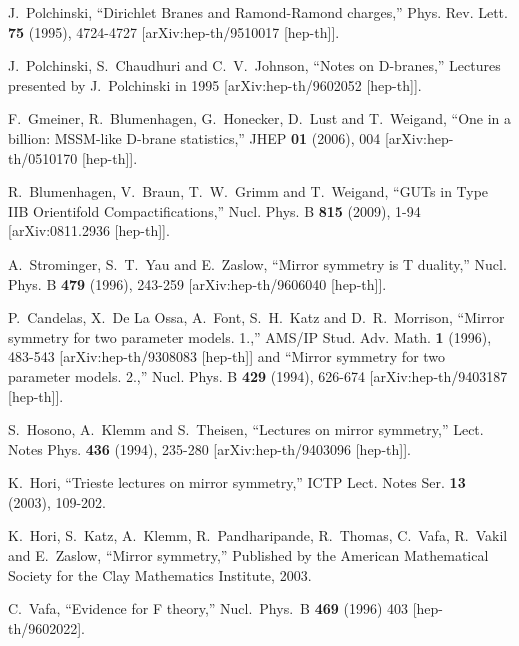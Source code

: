 \documentclass[12pt]{article}
\numberwithin{equation}{section}
\begin{document}
\begin{thebibliography}{999}
J.~Polchinski,
``Dirichlet Branes and Ramond-Ramond charges,''
Phys. Rev. Lett. \textbf{75} (1995), 4724-4727
[arXiv:hep-th/9510017 [hep-th]].

J.~Polchinski, S.~Chaudhuri and C.~V.~Johnson,
``Notes on D-branes,'' Lectures presented by J.~Polchinski in 1995 [arXiv:hep-th/9602052 [hep-th]].

F.~Gmeiner, R.~Blumenhagen, G.~Honecker, D.~Lust and T.~Weigand,
``One in a billion: MSSM-like D-brane statistics,''
JHEP \textbf{01} (2006), 004
[arXiv:hep-th/0510170 [hep-th]].

R.~Blumenhagen, V.~Braun, T.~W.~Grimm and T.~Weigand, ``GUTs in Type IIB Orientifold Compactifications,''
Nucl. Phys. B \textbf{815} (2009), 1-94
[arXiv:0811.2936 [hep-th]].

A.~Strominger, S.~T.~Yau and E.~Zaslow,
``Mirror symmetry is T duality,''
Nucl. Phys. B \textbf{479} (1996), 243-259
[arXiv:hep-th/9606040 [hep-th]].

P.~Candelas, X.~De La Ossa, A.~Font, S.~H.~Katz and D.~R.~Morrison,
``Mirror symmetry for two parameter models. 1.,''
AMS/IP Stud. Adv. Math. \textbf{1} (1996), 483-543
[arXiv:hep-th/9308083 [hep-th]]
and
``Mirror symmetry for two parameter models. 2.,''
Nucl. Phys. B \textbf{429} (1994), 626-674
[arXiv:hep-th/9403187 [hep-th]].

S.~Hosono, A.~Klemm and S.~Theisen,
``Lectures on mirror symmetry,''
Lect. Notes Phys. \textbf{436} (1994), 235-280
[arXiv:hep-th/9403096 [hep-th]].

K.~Hori, ``Trieste lectures on mirror symmetry,''
ICTP Lect. Notes Ser. \textbf{13} (2003), 109-202.

 K.~Hori, S.~Katz, A.~Klemm, R.~Pandharipande, R.~Thomas, C.~Vafa, R.~Vakil and E.~Zaslow, ``Mirror symmetry,'' Published by the American Mathematical Society for the Clay Mathematics Institute, 2003.

  C.~Vafa, ``Evidence for F theory,''
  Nucl.\ Phys.\ B {\bf 469} (1996) 403 [hep-th/9602022].


\end{thebibliography}
\end{document}
